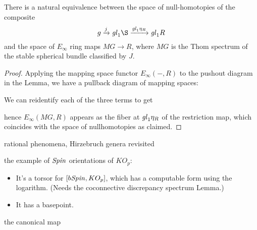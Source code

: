 \begin{corollary}
There is a natural equivalence between the space of null-homotopies of the composite \[g \xrightarrow j \gl_1 \S \xrightarrow{\gl_1 \eta_R} \gl_1 R\] and the space of $E_\infty$ ring maps $MG \to R$, where $MG$ is the Thom spectrum of the stable spherical bundle classified by $J$.
\end{corollary}
\begin{proof}
Applying the mapping space functor $E_\infty(-, R)$ to the pushout diagram in the Lemma, we have a pullback diagram of mapping spaces:
\begin{center}
\end{center}
We can reidentify each of the three terms to get
\begin{center}
\end{center}
hence $E_\infty(MG, R)$ appears as the fiber at $\mathit{gl}_1 \eta_R$ of the restriction map, which coincides with the space of nullhomotopies as claimed.
\end{proof}





rational phenomena, Hirzebruch genera revisited

the example of $\mathit{Spin}$ orientations of $KO_p$:
\begin{itemize}
  \item It's a torsor for $[b\mathit{Spin}, KO_p]$, which has a computable form using the logarithm.  (Needs the coconnective discrepancy spectrum Lemma.)
  \item It has a basepoint.
\end{itemize}

the canonical map

